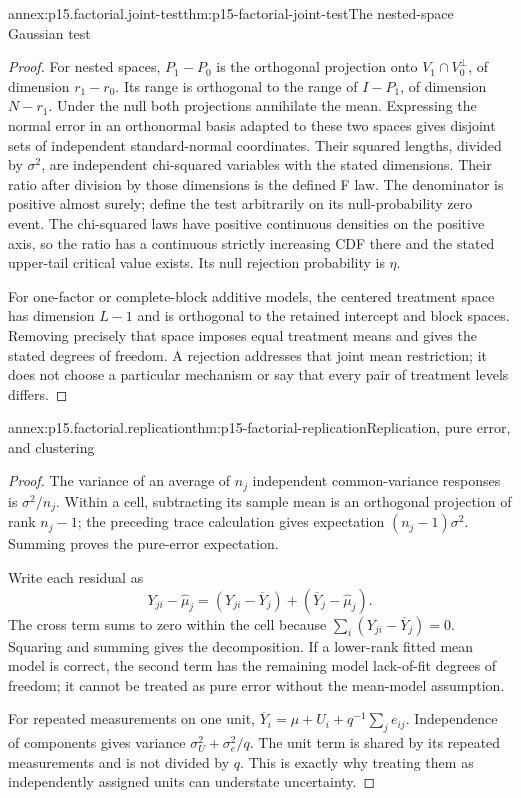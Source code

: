 \begin{annexitem}{annex:p15.factorial.joint-test}{thm:p15-factorial-joint-test}{The nested-space Gaussian test}
\begin{proof}
For nested spaces, \(P_1-P_0\) is the orthogonal projection onto
\(V_1\cap V_0^\perp\), of dimension \(r_1-r_0\). Its range is
orthogonal to the range of \(I-P_1\), of dimension \(N-r_1\).
Under the null both projections annihilate the mean. Expressing the normal
error in an orthonormal basis adapted to these two spaces gives disjoint
sets of independent standard-normal coordinates. Their squared lengths,
divided by \(\sigma^2\), are independent chi-squared variables with
the stated dimensions. Their ratio after division by those dimensions is
the defined F law. The denominator is positive almost surely; define the
test arbitrarily on its null-probability zero event. The chi-squared laws
have positive continuous densities on the positive axis, so the ratio has
a continuous strictly increasing CDF there and the stated upper-tail
critical value exists. Its null rejection probability is \(\eta\).

For one-factor or complete-block additive models, the centered treatment
space has dimension \(L-1\) and is orthogonal to the retained intercept
and block spaces. Removing precisely that space imposes equal treatment
means and gives the stated degrees of freedom. A rejection addresses that
joint mean restriction; it does not choose a particular mechanism or say
that every pair of treatment levels differs.
\end{proof}
\end{annexitem}

\begin{annexitem}{annex:p15.factorial.replication}{thm:p15-factorial-replication}{Replication, pure error, and clustering}
\begin{proof}
The variance of an average of \(n_j\) independent common-variance
responses is \(\sigma^2/n_j\). Within a cell, subtracting its sample
mean is an orthogonal projection of rank \(n_j-1\); the preceding trace
calculation gives expectation \((n_j-1)\sigma^2\). Summing proves the
pure-error expectation.

Write each residual as
\[
 Y_{ji}-\widehat\mu_j
 =(Y_{ji}-\overline Y_j)+(\overline Y_j-\widehat\mu_j).
\]
The cross term sums to zero within the cell because
\(\sum_i(Y_{ji}-\overline Y_j)=0\). Squaring and summing gives the
decomposition. If a lower-rank fitted mean model is correct, the second
term has the remaining model lack-of-fit degrees of freedom; it cannot be
treated as pure error without the mean-model assumption.

For repeated measurements on one unit,
\(\overline Y_i=\mu+U_i+q^{-1}\sum_je_{ij}\).
Independence of components gives variance
\(\sigma_U^2+\sigma_e^2/q\). The unit term is shared by its repeated
measurements and is not divided by \(q\). This is exactly why treating
them as independently assigned units can understate uncertainty.
\end{proof}
\end{annexitem}

